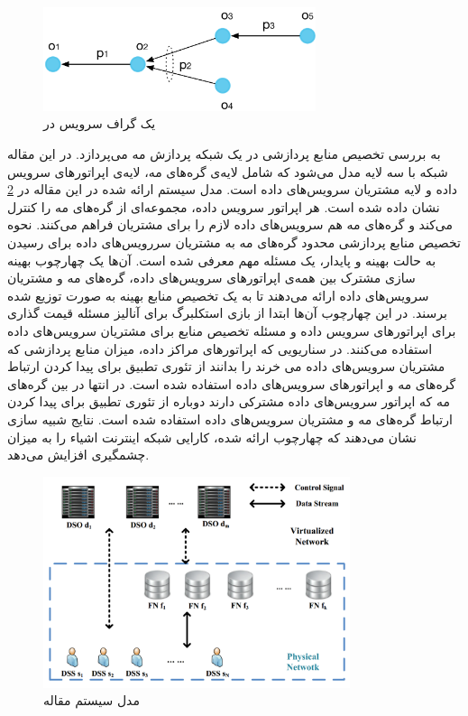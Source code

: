     \begin{figure}[h]
      \centerline{\includegraphics[width=8cm]{graphics/chapter_2/service_graph_barcelo2016iot}}
      \caption{یک گراف سرویس در \cite{barcelo2016iot}}
      \label{fig:chapter_2:service_graph_barcelo2016iot}
    \end{figure}

    \cite{zhang2017computing} به بررسی تخصیص منابع پردازشی در یک شبکه پردازش مه می‌پردازد.
    در این مقاله شبکه با سه لایه مدل می‌شود که شامل لایه‌ی گره‌های مه، لایه‌ی اپراتور‌های سرویس داده و لایه مشتریان سرویس‌های داده است.
    مدل سیستم ارائه شده در این مقاله در \cref{fig:chapter_2:system_model_zhang2017computing} نشان داده شده است.
    هر اپراتور سرویس داده، مجموعه‌ای از گره‌های مه را کنترل می‌کند و گره‌های مه هم سرویس‌های داده لازم را برای مشتریان فراهم می‌کنند.
    نحوه تخصیص منابع پردازشی محدود گره‌های مه به مشتریان سررویس‌های داده برای رسیدن به حالت بهینه و پایدار، یک مسئله مهم معرفی شده است.
    آن‌ها یک چهارچوب بهینه سازی مشترک بین همه‌ی اپراتور‌های سرویس‌های داده، گره‌های مه و مشتریان سرویس‌های داده ارائه می‌دهند تا به یک تخصیص منابع بهینه به صورت توزیع شده برسند.
    در این چهارچوب آن‌‌ها ابتدا از بازی استکلبرگ برای آنالیز مسئله قیمت گذاری برای اپراتور‌های سرویس داده و مسئله تخصیص منابع برای مشتریان سرویس‌های داده استفاده می‌کنند.
    در سناریویی که اپراتور‌های مراکز داده، میزان منابع پردازشی که مشتریان سرویس‌های داده می خرند را بدانند از تئوری تطبیق برای پیدا کردن ارتباط گره‌های مه و اپراتور‌های سرویس‌های داده استفاده شده است.
    در انتها در بین گره‌های مه که اپراتور سرویس‌های داده مشترکی دارند دوباره از تئوری تطبیق برای پیدا کردن ارتباط گره‌های مه و مشتریان سرویس‌های داده استفاده شده است.
    نتایج شبیه سازی نشان می‌دهند که چهارچوب ارائه شده، کارایی شبکه اینترنت اشیاء را به میزان چشمگیری افزایش می‌دهد.

    \begin{figure}[h]
      \centerline{\includegraphics[width=9cm]{graphics/chapter_2/system_model_zhang2017computing}}
      \caption{مدل سیستم مقاله \cite{zhang2017computing}}
      \label{fig:chapter_2:system_model_zhang2017computing}
    \end{figure}

